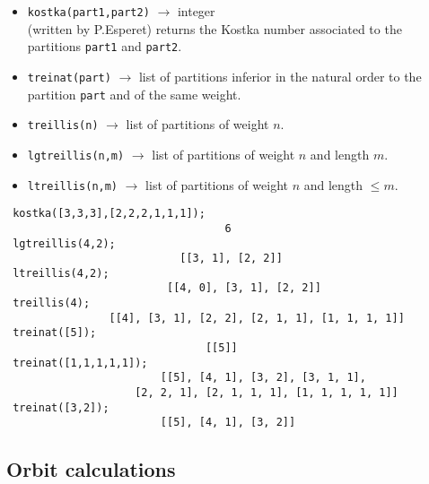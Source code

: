 \documentclass[11pt]{article}
\begin{document}
\begin{itemize}
  \item \texttt{kostka(part1,part2)} 
    $\longrightarrow$ integer \\
    (written by P.Esperet) returns the Kostka number associated to the
    partitions \texttt{part1} and \texttt{part2}.
  \item \texttt{treinat(part)}  
    $\longrightarrow$ list of partitions 
    inferior in the natural order to the partition \texttt{part} and of the same
    weight.
  \item\texttt{treillis(n)}  
    $\longrightarrow$ list of partitions of weight $n$.
  \item \texttt{lgtreillis(n,m)}  
    $\longrightarrow$ list of partitions of weight $n$ and length $m$.
  \item \texttt{ltreillis(n,m)} 
    $\longrightarrow$ list of partitions of weight $n$ and length $\le m$.
\end{itemize}
\small
\begin{verbatim}
 kostka([3,3,3],[2,2,2,1,1,1]);
                                  6
 lgtreillis(4,2);
                           [[3, 1], [2, 2]]
 ltreillis(4,2);
                         [[4, 0], [3, 1], [2, 2]]
 treillis(4);
                [[4], [3, 1], [2, 2], [2, 1, 1], [1, 1, 1, 1]]
 treinat([5]);
                               [[5]]
 treinat([1,1,1,1,1]);
                        [[5], [4, 1], [3, 2], [3, 1, 1],
                    [2, 2, 1], [2, 1, 1, 1], [1, 1, 1, 1, 1]]
 treinat([3,2]);
                        [[5], [4, 1], [3, 2]]
\end{verbatim}
\normalsize



\subsection{Orbit calculations}
\end{document}
